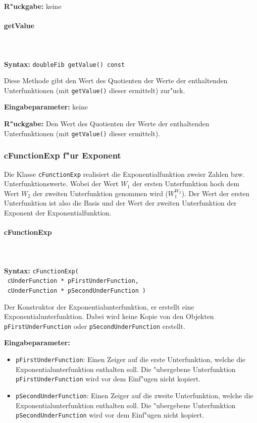 \bigskip\noindent
\textbf{R"uckgabe:} keine


\paragraph{getValue}

\ \\\\\noindent
\textbf{Syntax:} \verb|doubleFib getValue() const|

\bigskip\noindent
Diese Methode gibt den Wert des Quotienten der Werte der enthaltenden Unterfunktionen (mit \verb|getValue()| dieser ermittelt) zur"uck.

\bigskip\noindent
\textbf{Eingabeparameter:} keine

\bigskip\noindent
\textbf{R"uckgabe:} Den Wert des Quotienten der Werte der enthaltenden Unterfunktionen (mit \verb|getValue()| dieser ermittelt).


\subsubsection{cFunctionExp f"ur Exponent}

Die Klasse \verb|cFunctionExp| realisiert die Exponentialfunktion zweier Zahlen bzw. Unterfunktionswerte. Wobei der Wert $W_1$ der ersten Unterfunktion hoch dem Wert $W_2$ der zweiten Unterfunktion genommen wird ($W_1^{W_2}$). Der Wert der ersten Unterfunktion ist also die Basis und der Wert der zweiten Unterfunktion der Exponent der Exponentialfunktion.

\paragraph{cFunctionExp}

\ \\\\\noindent
\textbf{Syntax:} \verb|cFunctionExp(| \\\verb| cUnderFunction * pFirstUnderFunction,| \\\verb| cUnderFunction * pSecondUnderFunction )|

\bigskip\noindent
Der Konstruktor der Exponentialunterfunktion, er erstellt eine Exponentialunterfunktion. Dabei wird keine Kopie von den Objekten  \verb|pFirstUnderFunction| oder \verb|pSecondUnderFunction| erstellt.

\bigskip\noindent
\textbf{Eingabeparameter:}
\begin{itemize}
 \item \verb|pFirstUnderFunction|: Einen Zeiger auf die erste Unterfunktion, welche die Exponentialunterfunktion enthalten soll. Die "ubergebene Unterfunktion \verb|pFirstUnderFunction| wird vor dem Einf"ugen nicht kopiert.
 \item \verb|pSecondUnderFunction|: Einen Zeiger auf die zweite Unterfunktion, welche die Exponentialunterfunktion enthalten soll. Die "ubergebene Unterfunktion \verb|pSecondUnderFunction| wird vor dem Einf"ugen nicht kopiert.
\end{itemize}

